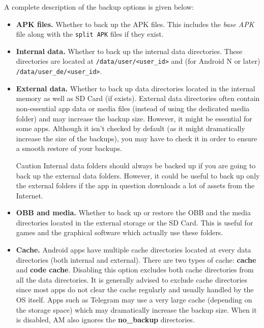 A complete description of the backup options is given below:
\begin{itemize}
    \item \textbf{APK files.} Whether to back up the APK files.
    This includes the \textit{base APK} file along with the \texttt{split APK} files if they exist.

    \item \textbf{Internal data.} Whether to back up the internal data directories.
    These directories are located at \texttt{/data/user/<user\_id>} and (for Android N or later) \texttt{/data/user\_de/<user\_id>}.

    \item \textbf{External data.} Whether to back up data directories located in the internal memory as well as SD Card (if exists).
    External data directories often contain non-essential app data or media files (instead of using the dedicated media folder) and may increase the backup size.
    However, it might be essential for some apps.
    Although it isn't checked by default (as it might dramatically increase the size of the backups), you may have to check it in order to ensure a smooth restore of your backups.
    \begin{warning}{Caution}
        Internal data folders should always be backed up if you are going to back up the external data folders.
        However, it could be useful to back up only the external folders if the app in question downloads a lot of assets from the Internet.
    \end{warning}

    \item \textbf{OBB and media.} Whether to back up or restore the OBB and the media directories located in the
    external storage or the SD Card.
    This is useful for games and the graphical software which actually use these folders.

    \item \textbf{Cache.} Android apps have multiple cache directories located at every data directories (both internal and external).
    There are two types of cache: \textbf{cache} and \textbf{code cache}.
    Disabling this option excludes both cache directories from all the data directories.
    It is generally advised to exclude cache directories since most apps do not clear the cache regularly and usually handled by the OS itself.
    Apps such as Telegram may use a very large cache (depending on the storage space) which may dramatically increase the backup size.
    When it is disabled, AM also ignores the \textbf{no\_backup} directories.


\end{itemize}
